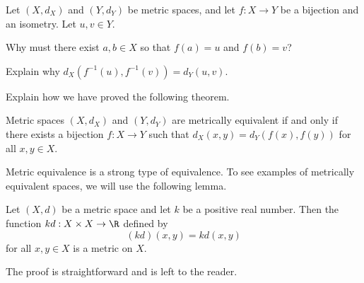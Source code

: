 \begin{activity} Let $(X,d_X)$ and $(Y,d_Y)$ be metric spaces, and let $f: X \to Y$ be a bijection and an isometry. Let $u, v \in Y$.
\ba
\item Why must there exist $a,b \in X$ so that $f(a) = u$ and $f(b) = v$?

\item Explain why $d_X(f^{-1}(u), f^{-1}(v)) = d_Y(u,v)$. 

\item  Explain how we have proved the following theorem.

\begin{theorem} Metric spaces $(X,d_X)$ and $(Y,d_Y)$ are metrically equivalent if and only if there exists a bijection $f: X \to Y$ such that $d_X(x,y) = d_Y(f(x), f(y))$ for all $x,y \in X$. 
\end{theorem}

\ea

\end{activity}

\begin{comment}

\ActivitySolution

\ba
\item Since $f$ is a bijection, $f$ is a surjection. So there exist $a,b \in X$ so that $f(a) = u$ and $f(b) = v$.

\item The fact that $f$ is an isometry means that 
\[d_X(f^{-1}(u), f^{-1}(v)) = d_Y(f(f^{-1}(u)), f(f^{-1}(v))) = d_Y(u,v).\] 

\item  The forward implication is the definition, and the reverse implication is proved in parts (a) and (b).  

\ea

\end{comment}

Metric equivalence is a strong type of equivalence. To see examples of metrically equivalent spaces, we will use the following lemma.

\begin{lemma} Let $(X,d)$ be a metric space and let $k$ be a positive real number. Then the function $kd : X \times X \to \R$ defined by
\[(kd)(x,y) = kd(x,y)\]
for all $x,y \in X$ is a metric on $X$.
\end{lemma}

The proof is straightforward and is left to the reader. 

